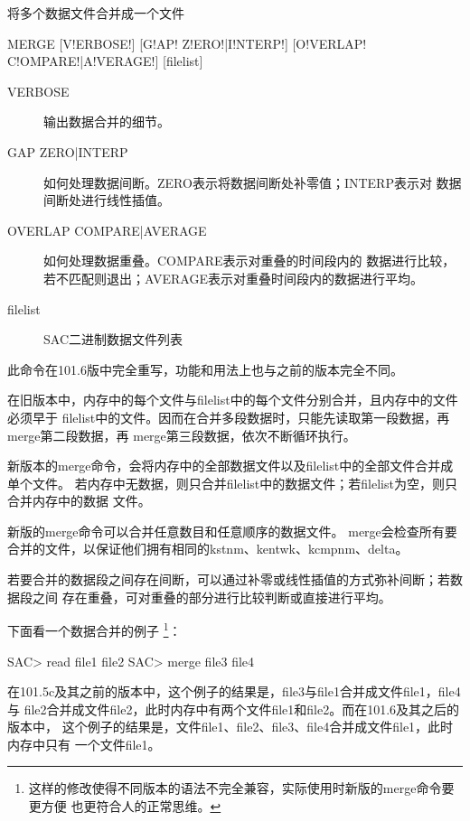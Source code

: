 \label{cmd:merge}

将多个数据文件合并成一个文件

\begin{SACSTX}
MERGE [V!ERBOSE!] [G!AP! Z!ERO!|I!NTERP!] [O!VERLAP! C!OMPARE!|A!VERAGE!] [filelist]
\end{SACSTX}

\begin{description}
\item [VERBOSE] 输出数据合并的细节。
\item [GAP ZERO|INTERP] 如何处理数据间断。ZERO表示将数据间断处补零值；INTERP表示对
    数据间断处进行线性插值。
\item [OVERLAP COMPARE|AVERAGE] 如何处理数据重叠。COMPARE表示对重叠的时间段内的
    数据进行比较，若不匹配则退出；AVERAGE表示对重叠时间段内的数据进行平均。
\item [filelist] SAC二进制数据文件列表
\end{description}

此命令在101.6版中完全重写，功能和用法上也与之前的版本完全不同。

在旧版本中，内存中的每个文件与filelist中的每个文件分别合并，且内存中的文件必须早于
filelist中的文件。因而在合并多段数据时，只能先读取第一段数据，再merge第二段数据，再
merge第三段数据，依次不断循环执行。

新版本的merge命令，会将内存中的全部数据文件以及filelist中的全部文件合并成单个文件。
若内存中无数据，则只合并filelist中的数据文件；若filelist为空，则只合并内存中的数据
文件。

新版的merge命令可以合并任意数目和任意顺序的数据文件。
merge会检查所有要合并的文件，以保证他们拥有相同的kstnm、kentwk、kcmpnm、delta。

若要合并的数据段之间存在间断，可以通过补零或线性插值的方式弥补间断；若数据段之间
存在重叠，可对重叠的部分进行比较判断或直接进行平均。

下面看一个数据合并的例子
\footnote{这样的修改使得不同版本的语法不完全兼容，实际使用时新版的merge命令要更方便
也更符合人的正常思维。}：
\begin{SACCode}
SAC> read file1 file2
SAC> merge file3 file4
\end{SACCode}
在101.5c及其之前的版本中，这个例子的结果是，file3与file1合并成文件file1，file4与
file2合并成文件file2，此时内存中有两个文件file1和file2。而在101.6及其之后的版本中，
这个例子的结果是，文件file1、file2、file3、file4合并成文件file1，此时内存中只有
一个文件file1。

